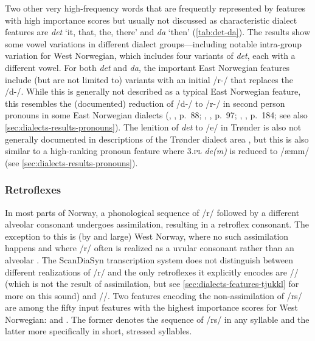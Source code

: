 Two other very high-frequency words that are frequently represented by features with high importance scores but usually not discussed as characteristic dialect features are \textit{det} `it, that, the, there' and \textit{da} `then' (\autoref{tab:det-da}).
The results show some vowel variations in different dialect groups---including notable intra-group variation for West Norwegian, which includes four variants of \textit{det}, each with a different vowel. 
For both \textit{det} and \textit{da}, the important East Norwegian features include (but are not limited to) variants with an initial /r-/ that replaces the /d-/.
While this is generally not described as a typical East Norwegian feature, this resembles the (documented) reduction of /d-/ to /r-/ in second person pronouns in some East Norwegian dialects (\citeauthor{haarstad2013spraak}, \citeyear{haarstad2013spraak}, p.~88; \citeauthor{endresen1990vikvaersk}, \citeyear{endresen1990vikvaersk}, p.~97; \citeauthor{wiggen1990oslo}, \citeyear{wiggen1990oslo}, p.~184; see also \autoref{sec:dialects-results-pronouns}).
The lenition of \textit{det} to /e/ in Tr\o{}nder is also not generally documented in descriptions of the Tr\o{}nder dialect area \citep[cf.][pp.~75--85]{maehlum2012dialektlandskapet}, but this is also similar to a high-ranking pronoun feature where \textsc{3.pl} \textit{de(m)} is reduced to /æmm/ (see \autoref{sec:dialects-results-pronouns}).

\subsubsection{Retroflexes}

In most parts of Norway, a phonological sequence of /r/ followed by a different alveolar consonant undergoes assimilation, resulting in a retroflex consonant.
The exception to this is (by and large) West Norway, where no such assimilation happens and where /r/ often is realized as a uvular consonant rather than an alveolar \citep[pp.~90, 185]{maehlum2012dialektlandskapet}.
The ScanDiaSyn transcription system does not distinguish between different realizations of /r/ and the only retroflexes it explicitly encodes are /\textrtailr/ (which is not the result of assimilation, but see \autoref{sec:dialects-features-tjukkl} for more on this sound) and /\textrtails/.
Two features encoding the non-assimilation of /rs/ are among the fifty input features with the highest importance scores for West Norwegian:  and .
The former denotes the sequence of /rs/ in any syllable and the latter more specifically in short, stressed syllables.

